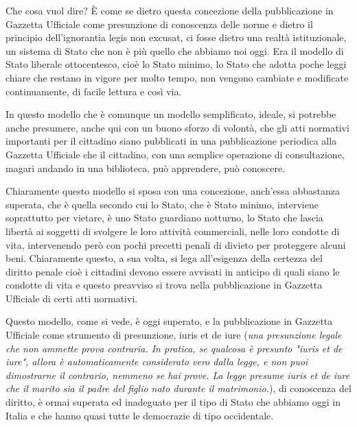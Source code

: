 Che cosa vuol dire? È come se dietro questa concezione della pubblicazione in Gazzetta Ufficiale come presunzione di conoscenza delle norme e dietro il principio dell'ignorantia legis non excusat, ci fosse dietro una realtà istituzionale, un sistema di Stato che non è più quello che abbiamo noi oggi. Era  il modello di Stato liberale ottocentesco, cioè lo Stato minimo, lo Stato che adotta poche leggi chiare che restano in vigore per molto tempo, non vengono cambiate e modificate continuamente, di facile lettura e così via.\par
In questo modello che è comunque un modello semplificato, ideale, si potrebbe anche presumere, anche qui con un buono sforzo di volontà, che gli atti normativi importanti per il cittadino siano pubblicati in una pubblicazione periodica alla Gazzetta Ufficiale che il cittadino, con una semplice operazione di consultazione, magari andando in una biblioteca, può apprendere, può conoscere. \par
Chiaramente questo modello si sposa con una concezione, anch'essa abbastanza superata, che è quella secondo cui lo Stato, che è Stato minimo, interviene soprattutto per vietare, è uno Stato guardiano notturno, lo Stato che lascia libertà ai soggetti di svolgere le loro attività commerciali, nelle loro condotte di vita, intervenendo però con pochi precetti penali di divieto per proteggere alcuni beni. Chiaramente questo, a sua volta, si lega all'esigenza della certezza del diritto penale cioè i cittadini devono essere avvisati in anticipo di quali siano le condotte di vita e questo preavviso si trova nella pubblicazione in Gazzetta Ufficiale di certi atti normativi.\par
Questo modello, come si vede, è oggi superato, e la pubblicazione in Gazzetta Ufficiale come strumento di presunzione, iuris et de iure (\textit{una presunzione legale che non ammette prova contraria. In pratica, se qualcosa è presunto "iuris et de iure", allora è automaticamente considerato vero dalla legge, e non puoi dimostrarne il contrario, nemmeno se hai prove. La legge presume iuris et de iure che il marito sia il padre del figlio nato durante il matrimonio.}), di conoscenza del diritto, è ormai superata ed inadeguato per il tipo di Stato che abbiamo oggi in Italia e che hanno quasi tutte le democrazie di tipo occidentale.\par
